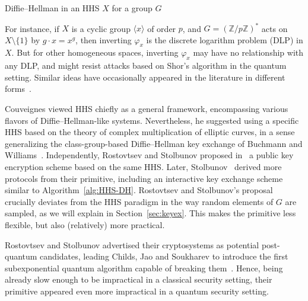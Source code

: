 \documentclass{llncs}
\newcommand{\Z}{\mathbb{Z}}
\begin{document}
\begin{algorithm}
    \caption{Diffie--Hellman in an HHS $X$ for a group $G$}
    \label{alg:HHS-DH}
\end{algorithm}


For instance, if $X$ is a
cyclic group $〈x〉$ of order $p$, and $G=(\Z/p\Z)^*$ acts on $X\setminus\{1\}$ by
$g·x=x^g$, then inverting $φ_x$ is the discrete logarithm problem (DLP) in $X$.
But for other homogeneous spaces, inverting $φ_x$ may have no relationship
with any DLP,
and might resist attacks based on Shor's algorithm in the quantum setting.
Similar ideas have occasionally appeared in the
literature in different forms~\cite{10.1007/3-540-44598-6_10,monico2007}.

Couveignes viewed HHS chiefly as a general framework, encompassing
various flavors of Diffie--Hellman-like systems. Nevertheless, he
suggested using a specific HHS based on the theory of complex
multiplication of elliptic curves, in a sense generalizing 
the class-group-based Diffie--Hellman key exchange of
Buchmann and Williams~\cite{Buchmann1988}. Independently, Rostovtsev
and Stolbunov proposed in~\cite{rostovtsev+stolbunov06} a public key
encryption scheme based on the same HHS. Later, Stolbunov~\cite{Stol}
derived more protocols from their primitive, including an interactive
key exchange scheme similar to Algorithm~\ref{alg:HHS-DH}.  Rostovtsev
and Stolbunov's proposal crucially deviates from the HHS paradigm in
the way random elements of $G$ are sampled, as we will explain in
Section~\ref{sec:keyex}. This makes the primitive less flexible, but
also (relatively) more practical.

Rostovtsev and Stolbunov advertised their cryptosystems as potential
post-quantum candidates, leading Childs, Jao and Soukharev to introduce
the first subexponential quantum algorithm capable of breaking
them~\cite{childs2014constructing}. 
Hence, being already slow enough to
be impractical in a classical security setting, their
primitive appeared even more impractical in a quantum
security setting.
\end{document}
